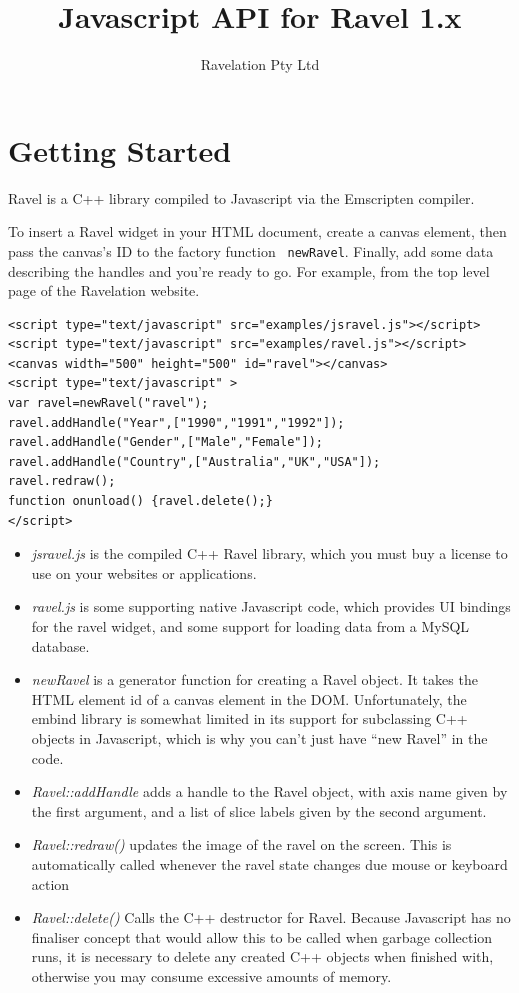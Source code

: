 \documentclass{article}
\title{Javascript API for Ravel 1.x}
\author{Ravelation Pty Ltd}
\begin{document}
\maketitle
\section{Getting Started}
Ravel is a C++ library compiled to Javascript via the Emscripten
compiler.

To insert a Ravel widget in your HTML document, create a
canvas element, then pass the canvas's ID to the factory function {\tt
  newRavel}. Finally, add some data describing the handles and you're
ready to go. For example, from the top level page of the Ravelation website.

\begin{verbatim}
<script type="text/javascript" src="examples/jsravel.js"></script>
<script type="text/javascript" src="examples/ravel.js"></script>
<canvas width="500" height="500" id="ravel"></canvas>
<script type="text/javascript" >
var ravel=newRavel("ravel");
ravel.addHandle("Year",["1990","1991","1992"]);
ravel.addHandle("Gender",["Male","Female"]);
ravel.addHandle("Country",["Australia","UK","USA"]);
ravel.redraw();
function onunload() {ravel.delete();}
</script>
\end{verbatim}

\begin{itemize}
\item {\em jsravel.js} is the compiled C++ Ravel library, which you must buy
  a license to use on your websites or applications.

\item {\em ravel.js} is some supporting native Javascript code, which
  provides UI bindings for the ravel widget, and some support for
  loading data from a MySQL database.

\item {\em newRavel} is a generator function for creating a Ravel
  object. It takes the HTML element id of a canvas element in the DOM.  
  Unfortunately, the embind library is somewhat limited in its support
  for subclassing C++ objects in Javascript, which is why you can't
  just have ``new Ravel'' in the code.

\item {\em Ravel::addHandle} adds a handle to the Ravel object, with axis name
  given by the first argument, and a list of slice labels given by the
  second argument.
  
\item {\em Ravel::redraw()} updates the image of the ravel on the
  screen. This is automatically called whenever the ravel state
  changes due mouse or keyboard action

\item {\em Ravel::delete()} Calls the C++ destructor for
  Ravel. Because Javascript has no finaliser concept that would allow
  this to be called when garbage collection runs, it is necessary
  to delete any created C++ objects when finished with, otherwise you
  may consume excessive amounts of memory.
\end{itemize}
\end{document}
